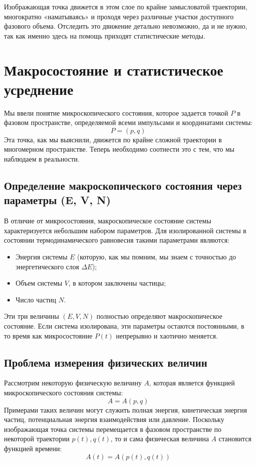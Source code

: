 \documentclass[../general/general]{subfiles}
\begin{document}
Изображающая точка движется в этом слое по крайне замысловатой траектории, многократно «наматываясь» и проходя через различные участки доступного фазового объема. Отследить это движение детально невозможно, да и не нужно, так как именно здесь на помощь приходят статистические методы.

\section{Макросостояние и статистическое усреднение}

Мы ввели понятие микроскопического состояния, которое задается точкой $P$ в фазовом пространстве, определяемой всеми импульсами и координатами системы:
\begin{equation}
    P = (p, q)
\end{equation}
Эта точка, как мы выяснили, движется по крайне сложной траектории в многомерном пространстве. Теперь необходимо соотнести это с тем, что мы наблюдаем в реальности.

\subsection{Определение макроскопического состояния через параметры (E, V, N)}

В отличие от микросостояния, макроскопическое состояние системы характеризуется небольшим набором параметров. Для изолированной системы в состоянии термодинамического равновесия такими параметрами являются:
\begin{itemize}
    \item Энергия системы $E$ (которую, как мы помним, мы знаем с точностью до энергетического слоя $\Delta E$);
    \item Объем системы $V$, в котором заключены частицы;
    \item Число частиц $N$.
\end{itemize}
Эти три величины $(E, V, N)$ полностью определяют макроскопическое состояние. Если система изолирована, эти параметры остаются постоянными, в то время как микросостояние $P(t)$ непрерывно и хаотично меняется.

\subsection{Проблема измерения физических величин}

Рассмотрим некоторую физическую величину $A$, которая является функцией микроскопического состояния системы:
\begin{equation}
    A = A(p, q)
\end{equation}
Примерами таких величин могут служить полная энергия, кинетическая энергия частиц, потенциальная энергия взаимодействия или давление. Поскольку изображающая точка системы перемещается в фазовом пространстве по некоторой траектории $p(t), q(t)$, то и сама физическая величина $A$ становится функцией времени:
\begin{equation}
    A(t) = A(p(t), q(t))
\end{equation}
\end{document}
